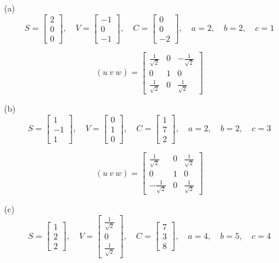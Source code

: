 \begin{enumerate}
    \item[(a)] 
    \[
    S = \begin{bmatrix} 2 \\ 0 \\ 0 \end{bmatrix}, 
    \quad V = \begin{bmatrix} -1 \\ 0 \\ -1 \end{bmatrix}, 
    \quad C = \begin{bmatrix} 0 \\ 0 \\ -2 \end{bmatrix}, 
    \quad a = 2, \quad b = 2, \quad c = 1
    \]

    \[
    ( u \ v \ w ) =
    \begin{bmatrix} 
    \frac{1}{\sqrt{2}} & 0 & -\frac{1}{\sqrt{2}} \\
    0 & 1 & 0 \\
    \frac{1}{\sqrt{2}} & 0 & \frac{1}{\sqrt{2}}
    \end{bmatrix}
    \]

    \item[(b)] 
    \[
    S = \begin{bmatrix} 1 \\ -1 \\ 1 \end{bmatrix}, 
    \quad V = \begin{bmatrix} 0 \\ 1 \\ 0 \end{bmatrix}, 
    \quad C = \begin{bmatrix} 1 \\ 7 \\ 2 \end{bmatrix}, 
    \quad a = 2, \quad b = 2, \quad c = 3
    \]

    \[
    ( u \ v \ w ) =
    \begin{bmatrix} 
    \frac{1}{\sqrt{2}} & 0 & \frac{1}{\sqrt{2}} \\
    0 & 1 & 0 \\
    -\frac{1}{\sqrt{2}} & 0 & \frac{1}{\sqrt{2}}
    \end{bmatrix}
    \]

    \item[(c)] 
    \[
    S = \begin{bmatrix} 1 \\ 2 \\ 2 \end{bmatrix}, 
    \quad V = \begin{bmatrix} \frac{1}{\sqrt{2}} \\ 0 \\ \frac{1}{\sqrt{2}} \end{bmatrix}, 
    \quad C = \begin{bmatrix} 7 \\ 3 \\ 8 \end{bmatrix}, 
    \quad a = 4, \quad b = 5, \quad c = 4
    \]


\end{enumerate}
